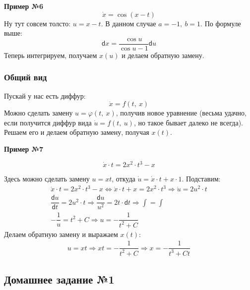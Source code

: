 \documentclass[a4paper,12pt]{article}
\renewcommand{\d}{\mathsf{d}}
\newcommand{\du}{\dot{u}}
\newcommand{\dx}{\dot{x}}
\newcommand{\ds}{\displaystyle}
\begin{document}
\textbf{Пример №6}
\[\dx = \cos (x - t)\]
Ну тут совсем толсто: $u = x - t$. В данном случае $a = -1,\ b = 1$. По формуле выше:
\[\d x = \dfrac{\cos u}{\cos u - 1}\d u\]
Теперь интегрируем, получаем $x(u)$ и делаем обратную замену.

\subsubsection{Общий вид}

Пускай у нас есть диффур:
\[\dx = f(t,\ x)\]
Можно сделать замену $u = \varphi(t,\ x)$, получив новое уравнение (весьма удачно, если получится диффур вида $\du = f(t,\ u)$, но такое бывает далеко не всегда). Решаем его и делаем обратную замену, получая $x(t)$.

\textbf{Пример №7}

\[\dx \cdot t = 2x^2 \cdot t^3 - x\]

Здесь можно сделать замену $u = xt$, откуда $\du = \dx \cdot t + x \cdot 1$. Подставим:
\begin{gather*}
	\dx \cdot t = 2x^2 \cdot t^3 - x \iff \dx \cdot t + x = 2x^2 \cdot t^3 \Longrightarrow \du = 2u^2 \cdot t \\
	\dfrac{\d u}{\d t} = 2u^2 \cdot t \Longrightarrow \dfrac{\d u}{u^2} = 2t \cdot \d t \Longrightarrow \ds\int = \int\\
	-\dfrac{1}{u} = t^2 + C \Longrightarrow u = -\dfrac{1}{t^2 + C}
\end{gather*}
Делаем обратную замену и выражаем $x(t)$:
\begin{gather*}
	u = xt \Longrightarrow xt = -\dfrac{1}{t^2 + C} \Longrightarrow x = -\dfrac{1}{t^3 + Ct}
\end{gather*}

\subsection{Домашнее задание №1}
\end{document}

